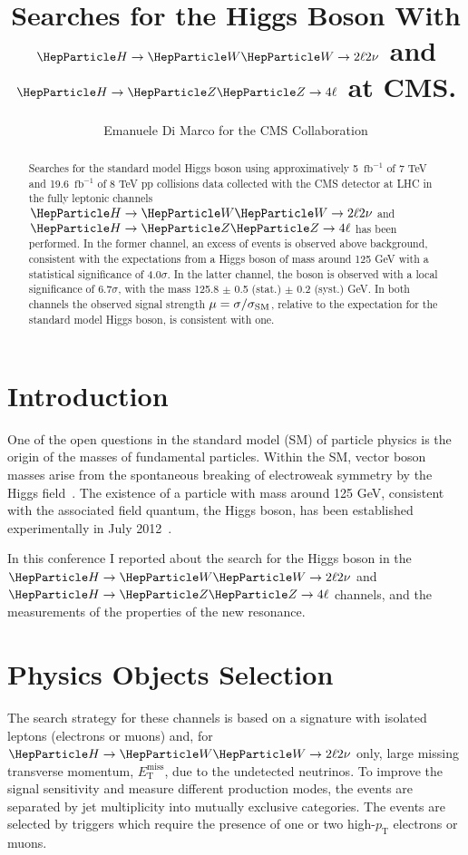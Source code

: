 \documentclass{cimento}
\title{Searches for the Higgs Boson With $\hwwtl$ and $\hzzfl$ at CMS.}
\author{Emanuele Di Marco for the CMS Collaboration}
\newcommand{\fbinv} {\mbox{\ensuremath{\,\text{fb}^\text{$-$1}}}\xspace}
\newcommand{\cPZ}{\PZ} %
\newcommand{\pt}{\ensuremath{p_{\mathrm{T}}}\xspace}
\newcommand{\ETm}{\ensuremath{E_{\mathrm{T}}^{\text{miss}}}\xspace}
\newcommand{\hzzfl}{\ensuremath{\PH\to\cPZ\cPZ\to4\ell}}
\newcommand{\hwwtl}{\ensuremath{\PH\to\PW\PW\to2\ell2\nu}}
\begin{document}
\maketitle

\begin{abstract}
Searches for the standard model Higgs boson using approximatively
5 \fbinv of 7 TeV and 19.6 \fbinv of 8 TeV pp collisions data
collected with the CMS detector at LHC in the fully leptonic channels
$\hwwtl$ and $\hzzfl$ has been performed.  In the former channel, an
excess of events is observed above background, consistent with the
expectations from a Higgs boson of mass around 125 GeV with a
statistical significance of 4.0$\sigma$.  In the latter channel, the
boson is observed with a local significance of 6.7$\sigma$, with the
mass 125.8 $\pm$ 0.5 (stat.) $\pm$ 0.2 (syst.) GeV. In both channels
the observed signal strength $\mu=\sigma/\sigma_{\rm SM}$, relative to
the expectation for the standard model Higgs boson, is consistent with
one.
\end{abstract}

%
%

\section{Introduction}

One of the open questions in the standard model (SM) of particle
physics is the origin of the masses of fundamental particles. Within
the SM, vector boson masses arise from the spontaneous breaking of
electroweak symmetry by the Higgs field~\cite{Higgs1, Higgs2}.  The
existence of a particle with mass around 125 GeV, consistent with the
associated field quantum, the Higgs boson, has been established
experimentally in July 2012~\cite{Chatrchyan:2012ufa,Aad:2012tfa}.

In this conference I reported about the search for the Higgs boson in
the $\hwwtl$ and $\hzzfl$ channels, and the measurements of the
properties of the new resonance.

\section{Physics Objects Selection}

The search strategy for these channels is based on a signature with
isolated leptons (electrons or muons) and, for $\hwwtl$ only, large
missing transverse momentum, $\ETm$, due to the undetected
neutrinos. To improve the signal sensitivity and measure different
production modes, the events are separated by jet multiplicity into
mutually exclusive categories.  The events are selected by triggers
which require the presence of one or two high-$\pt$ electrons or
muons.
\end{document}
